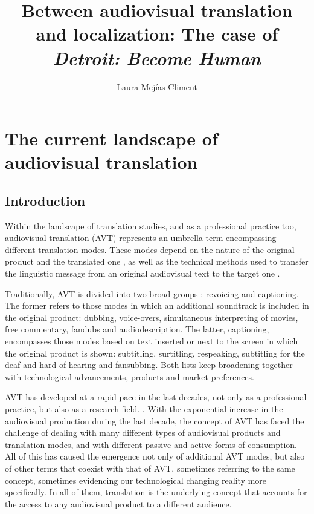 \documentclass[output=paper]{langsci/langscibook}
\author{Laura Mejías-Climent\affiliation{Universitat Jaume I}}
\title[Between audiovisual translation and localization]{Between audiovisual translation and localization: The case of \textit{Detroit: Become Human}}
\begin{document}
\maketitle

\section{The current landscape of audiovisual translation}

\subsection{Introduction}

Within the landscape of translation studies, and as a professional practice too, audiovisual translation (AVT) represents an umbrella term encompassing different translation modes. These modes depend on the nature of the original product and the translated one \parencite{hurtado11}, as well as the technical methods used to transfer the linguistic message from an original audiovisual text to the target one \parencite{chaume04}.

Traditionally, AVT is divided into two broad groups \parencite{chaume13}: revoicing and captioning. The former refers to those modes in which an additional soundtrack is included in the original product: dubbing, voice-overs, simultaneous interpreting of movies, free commentary, fandubs and audiodescription. The latter, captioning, encompasses those modes based on text inserted or next to the screen in which the original product is shown: subtitling, surtitling, respeaking, subtitling for the deaf and hard of hearing and fansubbing. Both lists keep broadening together with technological advancements, products and market preferences.

AVT has developed at a rapid pace in the last decades, not only as a professional practice, but also as a research field. . With the exponential increase in the audiovisual production during the last decade, the concept of AVT has faced the challenge of dealing with many different types of audiovisual products and translation modes, and with different passive and active forms of consumption. All of this has caused the emergence not only of additional AVT modes, but also of other terms that coexist with that of AVT, sometimes referring to the same concept, sometimes evidencing our technological changing reality more specifically. In all of them, translation is the underlying concept that accounts for the access to any audiovisual product to a different audience.
\end{document}
